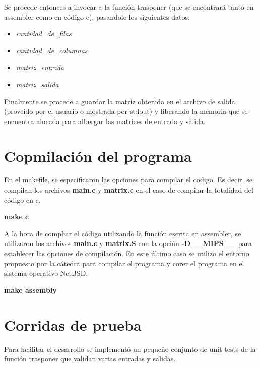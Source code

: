 \documentclass[11pt,a4paper]{article}
\begin{document}
Se procede entonces a invocar a la funci\'on trasponer (que se encontrar\'a tanto en assembler como en c\'odigo c), pasandole los siguientes datos:\\

\begin{itemize}
\item \textit{cantidad\_de\_filas}
\item \textit{cantidad\_de\_columnas}
\item \textit{matriz\_entrada}
\item \textit{matriz\_salida}
\end{itemize}

Finalmente se procede a guardar la matriz obtenida en el archivo de salida (proveido por el usuario o mostrada por stdout) y liberando la memoria que se encuentra alocada para albergar las matrices de entrada y salida.


\section{Copmilaci\'on del programa}

En el makefile, se especificaron las opciones para compilar el codigo. Es decir, se compilan los archivos \textbf{main.c} y \textbf{matrix.c} en el caso de compilar la totalidad del c\'odigo en c. 

\begin{center}
\textbf{make c}
\end{center}

A la hora de compliar el c\'odigo utilizando la funci\'on escrita en assembler, se utilizaron los archivos \textbf{main.c} y \textbf{matrix.S} con la opci\'on \textbf{-D\_\_MIPS\_\_} para establecer las opciones de compilaci\'on. En este \'ultimo caso se utilizo el entorno propuesto por la c\'atedra para compilar el programa y corer el programa en el sistema operativo NetBSD.\\

\begin{center}
\textbf{make assembly}
\end{center}

\section{Corridas de prueba}

Para facilitar el desarrollo se implementó un pequeño conjunto de unit tests
de la función trasponer que validan varias entradas y salidas.
\end{document}
